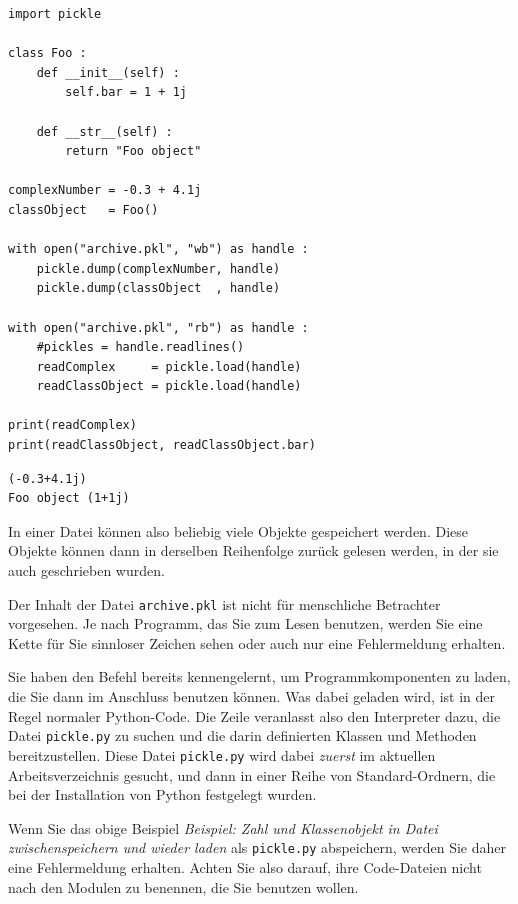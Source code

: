 \begin{codebox}
\begin{verbatim}
import pickle

class Foo :
    def __init__(self) :
        self.bar = 1 + 1j
        
    def __str__(self) :
        return "Foo object"

complexNumber = -0.3 + 4.1j
classObject   = Foo()

with open("archive.pkl", "wb") as handle :
    pickle.dump(complexNumber, handle)
    pickle.dump(classObject  , handle)

with open("archive.pkl", "rb") as handle :
    #pickles = handle.readlines()
    readComplex     = pickle.load(handle)
    readClassObject = pickle.load(handle)

print(readComplex)
print(readClassObject, readClassObject.bar)
\end{verbatim}
\end{codebox}

\begin{cmdbox}
\begin{verbatim}
(-0.3+4.1j)
Foo object (1+1j)
\end{verbatim}
\end{cmdbox}

In einer Datei können also beliebig viele Objekte gespeichert werden. Diese Objekte können dann in derselben Reihenfolge zurück gelesen werden, in der sie auch geschrieben wurden.

Der Inhalt der Datei \texttt{archive.pkl} ist nicht für menschliche Betrachter vorgesehen. Je nach Programm, das Sie zum Lesen benutzen, werden Sie eine Kette für Sie sinnloser Zeichen sehen oder auch nur eine Fehlermeldung erhalten.

\begin{hintbox}
Sie haben den Befehl  bereits kennengelernt, um Programmkomponenten zu laden, die Sie dann im Anschluss benutzen können. Was dabei geladen wird, ist in der Regel normaler Python-Code. Die Zeile  veranlasst also den Interpreter dazu, die Datei \texttt{pickle.py} zu suchen und die darin definierten Klassen und Methoden bereitzustellen. Diese Datei \texttt{pickle.py} wird dabei \emph{zuerst} im aktuellen Arbeitsverzeichnis gesucht, und dann in einer Reihe von Standard-Ordnern, die bei der Installation von Python festgelegt wurden.

Wenn Sie das obige Beispiel \emph{Beispiel: Zahl und Klassenobjekt in Datei zwischenspeichern und wieder laden} als \texttt{pickle.py} abspeichern, werden Sie daher eine Fehlermeldung erhalten. Achten Sie also darauf, ihre Code-Dateien nicht nach den Modulen zu benennen, die Sie benutzen wollen.
\end{hintbox}

